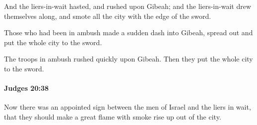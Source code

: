 			\begin{versebox}
					\item[BHS] 
					\item[ASV] And the liers-in-wait hasted, and rushed upon Gibeah; and the liers-in-wait drew themselves along, and smote all the city with the edge of the sword.
					\item[NIV] Those who had been in ambush made a sudden dash into Gibeah, spread out and put the whole city to the sword.
					\item[NRSV] The troops in ambush rushed quickly upon Gibeah. Then they put the whole city to the sword.
			\end{versebox}

		\paragraph{Judges 20:38} %
			\label{JUDGES-20-38}

			Now there was an appointed sign between the men of Israel and the liers in wait, that they should make a great flame with smoke rise up out of the city.

